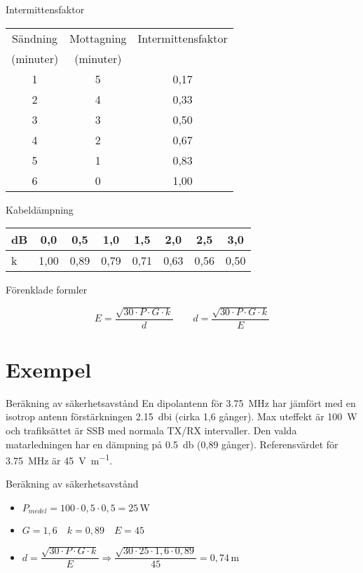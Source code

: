 \documentclass{beamer}
\begin{document}
\begin{frame}{Intermittensfaktor}
\begin{tabular}{|c|c|c|}
	\hline
	Sändning  & Mottagning & Intermittensfaktor \\
	(minuter) & (minuter)  & \\ \hline
	1 & 5 & 0,17 \\ \hline
	2 & 4 & 0,33 \\ \hline
	3 & 3 & 0,50 \\ \hline
	4 & 2 & 0,67 \\ \hline
	5 & 1 & 0,83 \\ \hline
	6 & 0 & 1,00 \\ \hline
\end{tabular}
\end{frame}

\begin{frame}{Kabeldämpning}
\begin{tabular}{|l|c|c|c|c|c|c|c|}
	\hline
	dB & 0,0  & 0,5  & 1,0  & 1,5  & 2,0  & 2,5  & 3,0 \\ \hline
	k  & 1,00 & 0,89 & 0,79 & 0,71 & 0,63 & 0,56 & 0,50 \\ \hline
\end{tabular}
\end{frame}

\begin{frame}{Förenklade formler}

\[ E=\dfrac{\sqrt{30 \cdot P \cdot G \cdot k}}{d}\qquad d=\dfrac{\sqrt{30 \cdot P \cdot G \cdot k}}{E}\]
\end{frame}

\section{Exempel}

\begin{frame}{Beräkning av säkerhetsavstånd}
En dipolantenn för \qty{3,75}{\mega\hertz} har jämfört med en isotrop antenn förstärkningen
\qty{2,15}{\decibel}i (cirka 1,6 gånger).
Max uteffekt är \qty{100}{\watt} och trafiksättet är SSB med normala TX/RX intervaller.
Den valda matarledningen har en dämpning på \qty{0,5}{\decibel} (0,89 gånger).
Referensvärdet för \qty{3,75}{\mega\hertz} är \qty{45}{\volt\per\meter}.
\end{frame}

\begin{frame}{Beräkning av säkerhetsavstånd}
\begin{itemize}
	\item \(P_{medel} = 100 \cdot 0,5 \cdot 0,5 = 25\, \mathrm{W}\) \vspace{4mm}
	\item \(G = 1,6 \quad k = 0,89 \quad E = 45\) \vspace{3mm}
	\item \(d = \dfrac{\sqrt{30 \cdot P \cdot G \cdot k}}{E} \Rightarrow \dfrac{\sqrt{30 \cdot 25 \cdot 1,6 \cdot 0,89}}{45} = 0,74\, \mathrm{m}\)
\end{itemize}
\end{frame}
\end{document}
